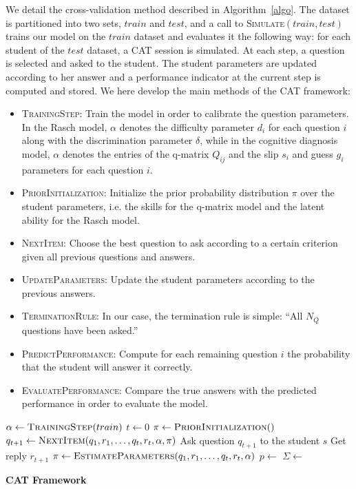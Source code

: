 \documentclass{edm_template}
\begin{document}
We detail the cross-validation method described in Algorithm~\ref{algo}. The dataset is partitioned into two sets, $train$ and $test$, and a call to \textsc{Simulate}$(train, test)$ trains our model on the $train$ dataset and evaluates it the following way: for each student of the $test$ dataset, a CAT session is simulated. At each step, a question is selected and asked to the student. The student parameters are updated according to her answer and a performance indicator at the current step is computed and stored. We here develop the main methods of the CAT framework:
\begin{itemize}
\item \textsc{TrainingStep}: Train the model in order to calibrate the question parameters. In the Rasch model, $\alpha$ denotes the difficulty parameter $d_i$ for each question $i$ along with the discrimination parameter $\delta$, while in the cognitive diagnosis model, $\alpha$ denotes the entries of the q-matrix $Q_{ij}$ and the slip $s_i$ and guess $g_i$ parameters for each question $i$.
\item \textsc{PriorInitialization}: Initialize the prior probability distribution $\pi$ over the student parameters, i.e. the skills for the q-matrix model and the latent ability for the Rasch model. 
\item \textsc{NextItem}: Choose the best question to ask according to a certain criterion given all previous questions and answers. 
\item \textsc{UpdateParameters}: Update the student parameters according to the previous answers.
\item \textsc{TerminationRule}: In our case, the termination rule is simple: ``All $N_Q$ questions have been asked.''
\item \textsc{PredictPerformance}: Compute for each remaining question $i$ the probability that the student will answer it correctly.
\item \textsc{EvaluatePerformance}: Compare the true answers with the predicted performance in order to evaluate the model. 
\end{itemize}

\begin{algorithm}
\begin{algorithmic}
\State $\alpha \gets \Call{TrainingStep}{train}$
\State $t \gets 0$
	\State $\pi \gets \Call{PriorInitialization}$
		\State $q_{t + 1} \gets \Call{NextItem}{q_1, r_1, \ldots, q_t, r_t, \alpha, \pi}$
		\State Ask question $q_{t + 1}$ to the student $s$
		\State Get reply $r_{t + 1}$
		\State $\pi \gets \Call{EstimateParameters}{q_1, r_1, \ldots, q_t, r_t, \alpha}$
		\State $p \gets$ 
		\State $\Sigma \gets$ 
	\EndWhile
\EndFor
\EndProcedure
\end{algorithmic}
\caption{\textbf{CAT Framework}}
\label{algo}
\end{algorithm}
\end{document}
